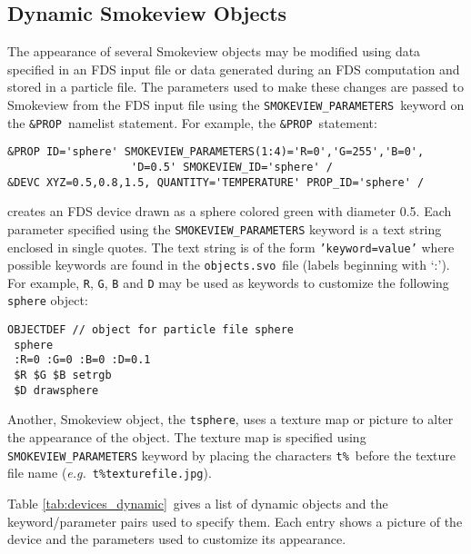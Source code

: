 %
\subsection{Dynamic Smokeview Objects}
The appearance of several Smokeview objects may be modified using data specified in an FDS input
file or data generated during an FDS computation and stored in a particle file. The parameters used to make these changes are passed
to Smokeview from the FDS input file using the {\tt SMOKEVIEW\_PARAMETERS}\ keyword on the {\tt \&PROP}\
namelist statement.  For example, the {\tt \&PROP}\ statement:
\begin{verbatim}
&PROP ID='sphere' SMOKEVIEW_PARAMETERS(1:4)='R=0','G=255','B=0',
                   'D=0.5' SMOKEVIEW_ID='sphere' /
&DEVC XYZ=0.5,0.8,1.5, QUANTITY='TEMPERATURE' PROP_ID='sphere' /
\end{verbatim}
creates an FDS device drawn as a sphere colored green with diameter 0.5. Each parameter specified using the
{\tt SMOKEVIEW\_PARAMETERS} keyword
is a text string enclosed in single quotes.  The text string is of the form {\tt 'keyword=value'} where possible
keywords are found in the {\tt objects.svo}\ file (labels beginning with `:').  For example, {\tt R}, {\tt G},
{\tt B} and {\tt D} may be used as keywords to customize the following {\tt sphere} object:
\begin{verbatim}
OBJECTDEF // object for particle file sphere
 sphere
 :R=0 :G=0 :B=0 :D=0.1
 $R $G $B setrgb
 $D drawsphere
\end{verbatim}

Another, Smokeview object, the {\tt tsphere}, uses a texture map or picture to alter the appearance of the object.
The texture map is specified using {\tt SMOKEVIEW\_PARAMETERS} keyword by placing the characters {\tt t\%}\
before the texture file name ({\em e.g.}\ {\tt t\%texturefile.jpg}).

Table \ref{tab:devices_dynamic}\ gives a list of dynamic objects and the keyword/parameter pairs used to specify them.
Each entry shows a picture of the device and the parameters used to customize its appearance.

